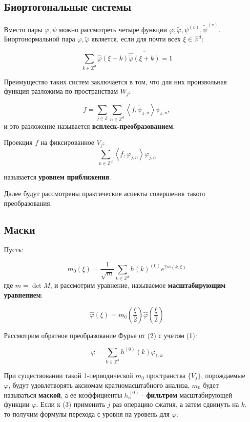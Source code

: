 \documentclass[a4paper,article,14pt]{extarticle}
\begin{document}
\subsection{Биортогональные системы}

Вместо пары $\varphi, \psi$ можно рассмотреть четыре функции $\varphi, \widetilde{\varphi}, \psi^{(v)}, \widetilde{\psi}^{(v)}$. Биортонормальной пара $\varphi, \widetilde{\varphi}$ является, если для почти всех $\xi \in \mathbb{R}^d$:

\[
\sum_{k \in \mathbb{Z}^d} \widehat{\varphi}(\xi + k) \overline{\widehat{\widetilde{\varphi}}(\xi+k)}=1
\]

Преимущество таких систем заключается в том, что для них произвольная функция разложима по пространствам $W_j$:

\[
	f = \sum_{j \in \mathbb{Z}} \sum_{n \in \mathbb{Z}^d} \left< f, \widetilde{\psi}_{j,n}\right> \psi_{j,n},
\]
и это разложение называется \textbf{всплеск-преобразованием}. 

Проекция $f$ на фиксированное $V_j$:
\[
	\sum_{n \in \mathbb{Z}^d} \left< f, \varphi_{j,n}\right> \varphi_{j,n}
\]

называется \textbf{уровнем приближения}.

Далее будут рассмотрены практические аспекты совершения такого преобразования.
\subsection{Маски}
Пусть:

\[
	m_0(\xi) = \frac{1}{\sqrt{m}} \sum_{k \in \mathbb{Z}^d} h(k)^{(0)} e^{2 \pi i (k,\xi)} \tag{1}
\]
где $m = \det M$, и рассмотрим уравнение, называемое \textbf{масштабирующим уравнением}:

\[
	\widehat{\varphi}(\xi) = m_0\left( \frac{\xi}{2}\right) \widehat{\varphi} \left( \frac{\xi}{2}\right) \tag{2}
\]


Рассмотрим обратное преобразование Фурье от (2) с учетом (1):

\[
	\varphi = \sum_{k \in \mathbb{Z}^d} h^{(0)}(k) \varphi_{1,k} \tag{3}
\]

При существовании такой 1-периодической $m_0$ пространства $\{V_j\}$, порождаемые $\varphi$, будут удовлетворять аксиомам кратномасштабного анализа, $m_0$ будет называться \textbf{маской}, а ее коэффициенты $h_n^{(0)}$ - \textbf{фильтром} масштабирующей функции $\varphi$. Если к (3) применить $j$ раз операцию сжатия, а затем сдвинуть на $k$, то получим формулы перехода с уровня на уровень для $\varphi$:
\end{document}
